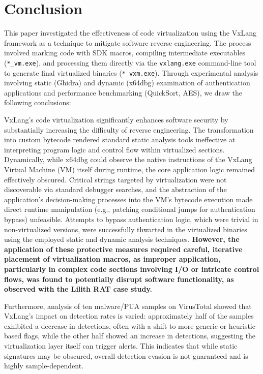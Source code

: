 \section{Conclusion} \label{sec:conclusion}
This paper investigated the effectiveness of code virtualization using the VxLang framework as a technique to mitigate software reverse engineering. The process involved marking code with SDK macros, compiling intermediate executables (\texttt{*\_vm.exe}), and processing them directly via the \texttt{vxlang.exe} command-line tool to generate final virtualized binaries (\texttt{*\_vxm.exe}). Through experimental analysis involving static (Ghidra) and dynamic (x64dbg) examination of authentication applications and performance benchmarking (QuickSort, AES), we draw the following conclusions:

VxLang's code virtualization significantly enhances software security by substantially increasing the difficulty of reverse engineering. The transformation into custom bytecode rendered standard static analysis tools ineffective at interpreting program logic and control flow within virtualized sections. Dynamically, while x64dbg could observe the native instructions of the VxLang Virtual Machine (VM) itself during runtime, the core application logic remained effectively obscured. Critical strings targeted by virtualization were not discoverable via standard debugger searches, and the abstraction of the application's decision-making processes into the VM's bytecode execution made direct runtime manipulation (e.g., patching conditional jumps for authentication bypass) unfeasible. Attempts to bypass authentication logic, which were trivial in non-virtualized versions, were successfully thwarted in the virtualized binaries using the employed static and dynamic analysis techniques. \textbf{However, the application of these protective measures required careful, iterative placement of virtualization macros, as improper application, particularly in complex code sections involving I/O or intricate control flows, was found to potentially disrupt software functionality, as observed with the Lilith RAT case study.}

Furthermore, analysis of ten malware/PUA samples on VirusTotal showed that VxLang's impact on detection rates is varied: approximately half of the samples exhibited a decrease in detections, often with a shift to more generic or heuristic-based flags, while the other half showed an increase in detections, suggesting the virtualization layer itself can trigger alerts. This indicates that while static signatures may be obscured, overall detection evasion is not guaranteed and is highly sample-dependent.

